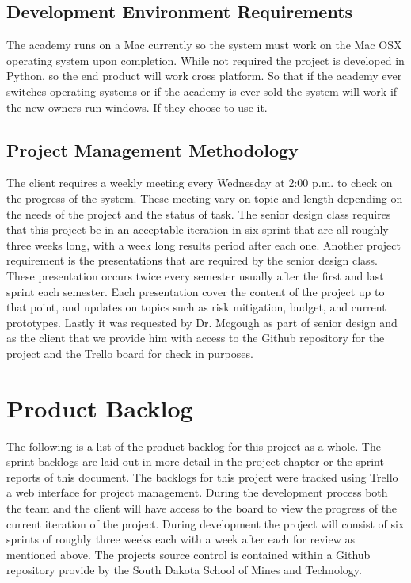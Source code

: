 \subsection{Development Environment Requirements}
The academy runs on a Mac currently so the system must work on the Mac OSX operating system upon completion. While not required the project is developed in Python, so the end product will work cross platform. So that if the academy ever switches operating systems or if the academy is ever sold the system will work if the new owners run windows. If they choose to use it.


\subsection{Project  Management Methodology}
The client requires a weekly meeting every Wednesday at 2:00 p.m. to check on the progress of the system. These meeting vary on topic and length depending on the needs of the project and the status of task. The senior design class requires that this project be in an acceptable iteration in six sprint that are all roughly three weeks long, with a week long results period after each one. Another project requirement is the presentations that are required by the senior design class. These presentation occurs twice every semester usually after the first and last sprint each semester. Each presentation cover the content of the project up to that point, and updates on topics such as risk mitigation, budget, and current prototypes. Lastly it was requested by Dr. Mcgough as part of senior design and as the client that we provide him with access to the Github repository for the project and the Trello board for check in purposes.


\section{Product Backlog}
The following is a list of the product backlog for this project as a whole.  The sprint backlogs are laid out in more detail in the project chapter or the sprint reports of this document. The backlogs for this project were tracked using Trello a web interface for project management. During the development process both the team and the client will have access to the board to view the progress of the current iteration of the project. During development the project will consist of six sprints of roughly three weeks each with a week after each for review as mentioned above. The projects source control is contained within a Github repository provide by the South Dakota School of Mines and Technology. 

